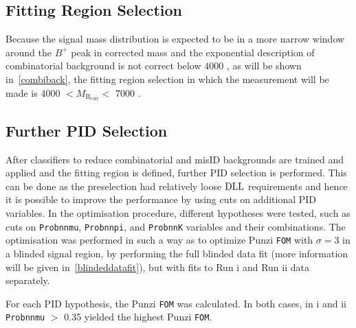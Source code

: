 \subsection{Fitting Region Selection}
\label{fittingsel}

Because the signal mass distribution is expected to be in a more narrow window around the $B^{+}$ peak in corrected mass and the exponential description of combinatorial background is not correct below $4000$ \mevcc, as will be shown in~\autoref{combiback}, the fitting region selection in which the measurement will be made is $4000$ \mevcc $<M_{\mathrm{B_{corr}}}<$ $7000$ \mevcc.

\subsection{Further \gls{PID} Selection}
\label{furtherpid}
After classifiers to reduce combinatorial and misID backgrounds are trained and applied and the fitting region is defined, further \gls{PID} selection is performed. This can be done as the preselection had relatively loose $\rm{DLL}$ requirements and hence it is possible to improve the performance by using cuts on additional \gls{PID} variables. In the optimisation procedure, different hypotheses were tested, such as cuts on \texttt{Probnnmu}, \texttt{Probnnpi}, and \texttt{ProbnnK} variables and their combinations. The optimisation was performed in such a way as to optimize Punzi \texttt{FOM} with $\sigma=3$ in a blinded signal region, by performing the full blinded data fit (more information will be given in~\autoref{blindeddatafit}), but with fits to Run \Rn{1} and Run \Rn{2} data separately.


For each PID hypothesis, the Punzi \texttt{FOM} was calculated. In both cases, in \Rn{1} and \Rn{2} \texttt{Probnnmu} $>$ 0.35 yielded the highest Punzi \texttt{FOM}.







